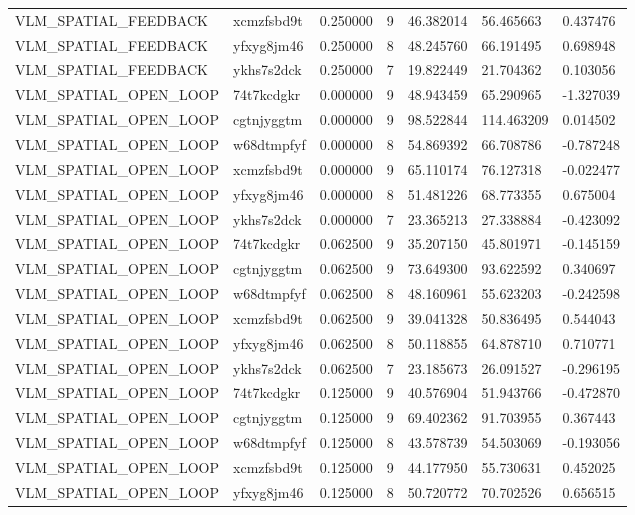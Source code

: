 \begin{tabular}{lllllll}
VLM\_SPATIAL\_FEEDBACK & xcmzfsbd9t & 0.250000 & 9 & 46.382014 & 56.465663 & 0.437476 \\
VLM\_SPATIAL\_FEEDBACK & yfxyg8jm46 & 0.250000 & 8 & 48.245760 & 66.191495 & 0.698948 \\
VLM\_SPATIAL\_FEEDBACK & ykhs7s2dck & 0.250000 & 7 & 19.822449 & 21.704362 & 0.103056 \\
VLM\_SPATIAL\_OPEN\_LOOP & 74t7kcdgkr & 0.000000 & 9 & 48.943459 & 65.290965 & -1.327039 \\
VLM\_SPATIAL\_OPEN\_LOOP & cgtnjyggtm & 0.000000 & 9 & 98.522844 & 114.463209 & 0.014502 \\
VLM\_SPATIAL\_OPEN\_LOOP & w68dtmpfyf & 0.000000 & 8 & 54.869392 & 66.708786 & -0.787248 \\
VLM\_SPATIAL\_OPEN\_LOOP & xcmzfsbd9t & 0.000000 & 9 & 65.110174 & 76.127318 & -0.022477 \\
VLM\_SPATIAL\_OPEN\_LOOP & yfxyg8jm46 & 0.000000 & 8 & 51.481226 & 68.773355 & 0.675004 \\
VLM\_SPATIAL\_OPEN\_LOOP & ykhs7s2dck & 0.000000 & 7 & 23.365213 & 27.338884 & -0.423092 \\
VLM\_SPATIAL\_OPEN\_LOOP & 74t7kcdgkr & 0.062500 & 9 & 35.207150 & 45.801971 & -0.145159 \\
VLM\_SPATIAL\_OPEN\_LOOP & cgtnjyggtm & 0.062500 & 9 & 73.649300 & 93.622592 & 0.340697 \\
VLM\_SPATIAL\_OPEN\_LOOP & w68dtmpfyf & 0.062500 & 8 & 48.160961 & 55.623203 & -0.242598 \\
VLM\_SPATIAL\_OPEN\_LOOP & xcmzfsbd9t & 0.062500 & 9 & 39.041328 & 50.836495 & 0.544043 \\
VLM\_SPATIAL\_OPEN\_LOOP & yfxyg8jm46 & 0.062500 & 8 & 50.118855 & 64.878710 & 0.710771 \\
VLM\_SPATIAL\_OPEN\_LOOP & ykhs7s2dck & 0.062500 & 7 & 23.185673 & 26.091527 & -0.296195 \\
VLM\_SPATIAL\_OPEN\_LOOP & 74t7kcdgkr & 0.125000 & 9 & 40.576904 & 51.943766 & -0.472870 \\
VLM\_SPATIAL\_OPEN\_LOOP & cgtnjyggtm & 0.125000 & 9 & 69.402362 & 91.703955 & 0.367443 \\
VLM\_SPATIAL\_OPEN\_LOOP & w68dtmpfyf & 0.125000 & 8 & 43.578739 & 54.503069 & -0.193056 \\
VLM\_SPATIAL\_OPEN\_LOOP & xcmzfsbd9t & 0.125000 & 9 & 44.177950 & 55.730631 & 0.452025 \\
VLM\_SPATIAL\_OPEN\_LOOP & yfxyg8jm46 & 0.125000 & 8 & 50.720772 & 70.702526 & 0.656515 \\

\end{tabular}
